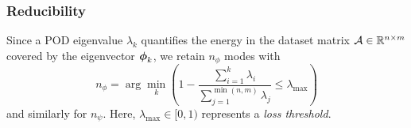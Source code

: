 \documentclass[10pt,xcolor=dvipsnames]{beamer}
\begin{document}

\begin{frame}[t]

  \frametitle{Reducibility}

  \justifying Since a POD eigenvalue $\lambda_k$ quantifies the energy in the dataset matrix ${\mathcal A} \in {\mathbb R}^{n \times m}$ covered by the eigenvector ${\boldsymbol \phi}_k$, we retain $n_\phi$ modes with
  \begin{equation*}
   n_\phi = \arg \min_{k} \left( 1 - \frac{\sum_{i = 1}^{k} \lambda_i}{\sum_{j = 1}^{\min(n, m)} \lambda_j} \leq \lambda_{\max} \right)
  \end{equation*}
  and similarly for $n_\psi$. Here, $\lambda_{\max}\in[0, 1)$ represents a \textit{loss threshold}.


\end{frame}
\end{document}
